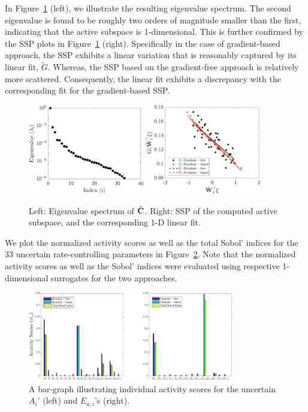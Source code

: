 In Figure~\ref{fig:hd} (left), we illustrate the resulting eigenvalue spectrum. The second eigenvalue is
found to be roughly two orders of magnitude smaller than the first, indicating that the active subspace
is 1-dimensional. This is further confirmed by the SSP plots in Figure~\ref{fig:hd} (right). Specifically
in the case of gradient-based approach, the SSP exhibits a linear variation that is reasonably
captured by its linear fit, $\tilde{G}$. Whereas, the SSP based on the gradient-free approach
is relatively more scattered. Consequently, the linear fit exhibits a discrepancy with the corresponding
fit for the gradient-based SSP. 
%
\begin{figure}[htbp]
 \begin{center}
   \includegraphics[width=0.45\textwidth]{./Figures/eig_33D}
   \includegraphics[width=0.45\textwidth]{./Figures/ssp_33D}
\caption{Left: Eigenvalue spectrum of $\hat{\mathbf{{C}}}$. Right: SSP of the computed active subspace, and the
corresponding 1-D linear fit.} 
\label{fig:hd}
\end{center}
\end{figure}
%
We plot the normalized activity scores as well as the total Sobol' indices for the 33 uncertain 
rate-controlling parameters in Figure~\ref{fig:as_33D}. Note that the normalized activity scores
as well as the Sobol' indices
were evaluated using respective 1-dimensional surrogates for the two approaches.
%
\begin{figure}[htbp]
 \begin{center}
  \includegraphics[width=0.8\textwidth]{./Figures/as_33D_new}
\caption{A bar-graph illustrating individual activity scores for the uncertain $A_i$' (left) and $E_{a,i}$'s (right).}
\label{fig:as_33D}
\end{center}
\end{figure}
%

